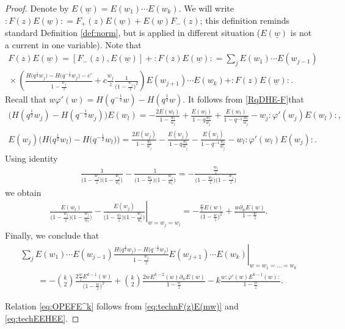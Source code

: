\documentclass[pdftex]{sigma}
\numberwithin{equation}{section}
\theoremstyle{definition}
\newcommand{\half}{\frac{1}{2}}
\newcommand{\mw}{\underline{w}}
\begin{document}
\begin{proof}
Denote by $E(\mw) = E(w_1) \cdots E(w_k)$. We will write ${:\!F(z) E(\mw)\!:} = F_+ (z)E(\mw)+E(\mw) F_-(z)$; this definition reminds standard Definition \ref{def:norm}, but is applied in different situation ($E(\mw)$ is not a current in one variable). Note that \begin{gather}
F(z) E(\mw) = [F_- (z), E(\mw)] + {:\!F(z) E(\mw)\!:} = \sum_j E(w_1) \cdots E(w_{j-1})\label{eq:technF(z)E(mw)}\\
{}\times \left( \frac{H\big(q^{\half}w_{j}\big) - H\big(q^{-\half}w_{j}\big)-c'}{1-\frac{w_{j}}{z}} +c\frac{w_{j}}{z} \frac{1}{\big(1-\frac{w_j}{z}\big)^2} \right) E(w_{j+1}) \cdots E(w_k) +:\!F(z) E(\mw)\!:. \nonumber
\end{gather}
Recall that $w \varphi'(w) = H(q^{-\half}w) -H(q^{\half}w) $. It follows from \eqref{RqDHE-F}that
\begin{gather*}
\big(H(q^{\half}w_j) -H(q^{-\half}w_j) \big)E(w_l) = -\frac{2E(w_l)}{1-\frac{w_l}{w_j}} + \frac{E(w_l)}{1-q\frac{w_l}{w_j}}+\frac{E(w_l)}{1-q^{-1}\frac{w_l}{w_j}} -w_j :\!\varphi'(w_j) E(w_l)\!:,\\
E(w_j) \big(H\big(q^{\half}w_l\big) -H\big(q^{-\half}w_l\big) \big) = \frac{2E(w_j)}{1-\frac{w_l}{w_j}} - \frac{E(w_j)}{1-q\frac{w_l}{w_j}}-\frac{E(w_j)}{1-q^{-1}\frac{w_l}{w_j}} -w_l :\!\varphi'(w_l) E(w_j)\!:.
\end{gather*}
Using identity
\begin{gather*}
\frac{1}{\big(1-\frac{w_j}{z}\big)\big(1-\frac{w_j}{w_l}\big)}-\frac{1}{\big(1-\frac{w_l}{z}\big)\big(1-\frac{w_j}{w_l}\big)} = - \frac{\frac{w_l}{z}}{\big(1-\frac{w_l}{z}\big)\big(1-\frac{w_j}{z}\big)}
\end{gather*}
we obtain
\begin{gather*}
\left. \frac{E(w_l)}{\big(1-\frac{w_j}{z}\big)\big(1-\frac{w_j}{w_l}\big)}-\frac{E(w_j)}{\big(1-\frac{w_l}{z}\big) \big(1-\frac{w_j}{w_l}\big)} \right|_{w=w_j=w_l} =- \frac{\frac{w}{z}E(w)}{\big(1-\frac{w}{z}\big)^2} + \frac{w \partial_{w} E(w)}{1-\frac{w}{z}}.
\end{gather*}
Finally, we conclude that
\begin{gather}
\left. \sum_j E(w_1) \cdots E(w_{j-1}) \frac{H\big(q^{\half}w_{j}\big) - H\big(q^{-\half}w_{j}\big)}{1-\frac{w_{j}}{z}} E(w_{j+1}) \cdots E(w_k) \right|_{w= w_1 = \dots = w_k} \nonumber\\
\qquad{} = - \binom{k}{2} \frac{2\frac{w}{z} E^{k-1}(w)}{\big(1-\frac{w}{z}\big)^2}
+ \binom{k}{2} \frac{2w E^{k-2}(w) \partial_w E(w)}{1-\frac{w}{z}} - k \frac{w:\!\varphi'(w) E^{k-1}(w)\!:}{1-\frac{w}{z}}.
\label{eq:techEEHEE}
\end{gather}

Relation \eqref{eq:OPEFE^k} follows from \eqref{eq:technF(z)E(mw)} and \eqref{eq:techEEHEE}.
\end{proof}
\end{document}
